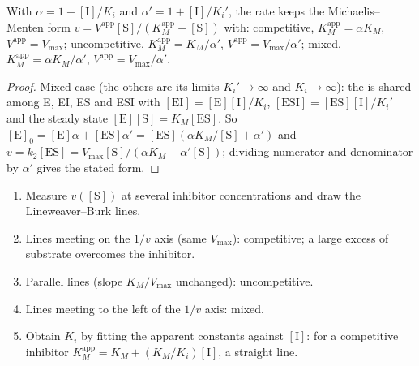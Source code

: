 \begin{proposition}\label{prop:b3:complex-kinetics:inhibition-laws}
With $\alpha = 1 + [\mathrm I]/K_i$ and $\alpha' = 1 + [\mathrm I]/K_i'$, the rate keeps the
Michaelis--Menten form $v = V^{\mathrm{app}}[\mathrm S]/(K_M^{\mathrm{app}} + [\mathrm S])$ with: competitive,
$K_M^{\mathrm{app}} = \alpha K_M$, $V^{\mathrm{app}} = V_{\max}$; uncompetitive, $K_M^{\mathrm{app}} = K_M/\alpha'$, $V^{\mathrm{app}} =
V_{\max}/\alpha'$; mixed, $K_M^{\mathrm{app}} = \alpha K_M/\alpha'$, $V^{\mathrm{app}} = V_{\max}/\alpha'$.
\end{proposition}

\begin{proof}
Mixed case (the others are its limits $K_i' \to \infty$ and $K_i \to \infty$): the  is
shared among E, EI, ES and ESI with $[\mathrm{EI}] = [\mathrm E][\mathrm I]/K_i$, $[\mathrm{ESI}] = [\mathrm{ES}][\mathrm I]/K_i'$
and the steady state $[\mathrm E][\mathrm S] = K_M[\mathrm{ES}]$. So $[\mathrm E]_0 = [\mathrm E]\alpha + [\mathrm{ES}]\alpha' =
[\mathrm{ES}](\alpha K_M/[\mathrm S] + \alpha')$ and $v = k_2[\mathrm{ES}] = V_{\max}[\mathrm S]/(\alpha K_M + \alpha'[\mathrm S])$; dividing numerator
and denominator by $\alpha'$ gives the stated form.
\end{proof}

\begin{method}\label{met:b3:complex-kinetics:inhibition-type}
\begin{enumerate}
  \item Measure $v([\mathrm S])$ at several inhibitor concentrations and draw the
        Lineweaver--Burk lines.
  \item Lines meeting on the $1/v$ axis (same $V_{\max}$): competitive; a large excess
        of substrate overcomes the inhibitor.
  \item Parallel lines (slope $K_M/V_{\max}$ unchanged): uncompetitive.
  \item Lines meeting to the left of the $1/v$ axis: mixed.
  \item Obtain $K_i$ by fitting the apparent constants against $[\mathrm I]$: for a
        competitive inhibitor $K_M^{\mathrm{app}} = K_M + (K_M/K_i)[\mathrm I]$, a straight line.
\end{enumerate}
\end{method}

